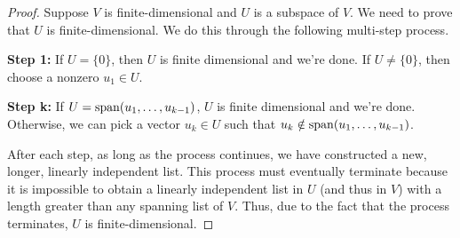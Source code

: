\begin{proof}
    Suppose $V$ is finite-dimensional and $U$ is a subspace of $V$. We need to prove that $U$ is finite-dimensional. We do this through the following multi-step process.

    \textbf{Step 1:} If $U = \{0\}$, then $U$ is finite dimensional and we're done. If $U \ne \{0\}$, then choose a nonzero $u_1 \in U$.

    \textbf{Step k:} If $U = \operatorname{span}(u_1, \dots, u_{k-1})$, $U$ is finite dimensional and we're done. Otherwise, we can pick a vector $u_k\in U$ such that $u_k\notin\operatorname{span}(u_1, \dots, u_{k-1})$. 
    
    After each step, as long as the process continues, we have constructed a new, longer, linearly independent list. This process must eventually terminate because it is impossible to obtain a linearly independent list in $U$ (and thus in $V$) with a length greater than any spanning list of $V$. Thus, due to the fact that the process terminates, $U$ is finite-dimensional.
\end{proof}
